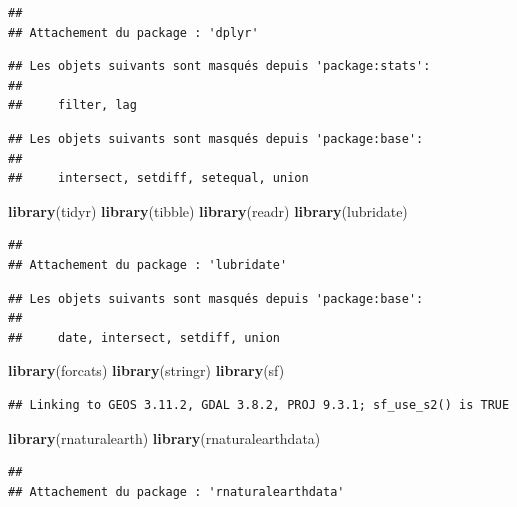 \documentclass[
]{article}
\newenvironment{Shaded}{\begin{snugshade}}{\end{snugshade}}
\newcommand{\FunctionTok}[1]{\textcolor[rgb]{0.13,0.29,0.53}{\textbf{#1}}}
\newcommand{\NormalTok}[1]{#1}
\begin{document}
\begin{verbatim}
## 
## Attachement du package : 'dplyr'
\end{verbatim}

\begin{verbatim}
## Les objets suivants sont masqués depuis 'package:stats':
## 
##     filter, lag
\end{verbatim}

\begin{verbatim}
## Les objets suivants sont masqués depuis 'package:base':
## 
##     intersect, setdiff, setequal, union
\end{verbatim}

\begin{Shaded}
\begin{Highlighting}[]
\FunctionTok{library}\NormalTok{(tidyr)}
\FunctionTok{library}\NormalTok{(tibble)}
\FunctionTok{library}\NormalTok{(readr)}
\FunctionTok{library}\NormalTok{(lubridate)}
\end{Highlighting}
\end{Shaded}

\begin{verbatim}
## 
## Attachement du package : 'lubridate'
\end{verbatim}

\begin{verbatim}
## Les objets suivants sont masqués depuis 'package:base':
## 
##     date, intersect, setdiff, union
\end{verbatim}

\begin{Shaded}
\begin{Highlighting}[]
\FunctionTok{library}\NormalTok{(forcats)}
\FunctionTok{library}\NormalTok{(stringr)}
\FunctionTok{library}\NormalTok{(sf)}
\end{Highlighting}
\end{Shaded}

\begin{verbatim}
## Linking to GEOS 3.11.2, GDAL 3.8.2, PROJ 9.3.1; sf_use_s2() is TRUE
\end{verbatim}

\begin{Shaded}
\begin{Highlighting}[]
\FunctionTok{library}\NormalTok{(rnaturalearth)}
\FunctionTok{library}\NormalTok{(rnaturalearthdata)}
\end{Highlighting}
\end{Shaded}

\begin{verbatim}
## 
## Attachement du package : 'rnaturalearthdata'
\end{verbatim}
\end{document}
